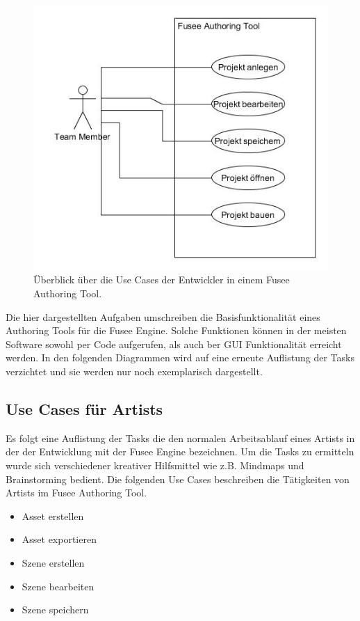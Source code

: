 \documentclass[pagesize, paper=a4, fontsize=12pt, titlepage=true, headings=small, headnosepline, abstractoff, liststotoc, nochapterprefix, plainheadsepline, twoside]{scrreprt}
\begin{document}
\begin{figure}[ht]
	\centering
	\includegraphics[width=\linewidth]{Bilder/UseCase_Allgemein.jpg}
	\caption{Überblick über die Use Cases der Entwickler in einem Fusee Authoring Tool.}
	\label{UseCaseAllgemein}
\end{figure}
Die hier dargestellten Aufgaben umschreiben die Basisfunktionalität eines Authoring Tools für die Fusee Engine. Solche Funktionen können in der meisten Software sowohl per Code aufgerufen, als auch ber GUI Funktionalität erreicht werden. In den folgenden Diagrammen wird auf eine erneute Auflistung der Tasks verzichtet und sie werden nur noch exemplarisch dargestellt.

\subsection{Use Cases für Artists}
Es folgt eine Auflistung der Tasks die den normalen Arbeitsablauf eines Artists in der der Entwicklung mit der Fusee Engine bezeichnen. Um die Tasks zu ermitteln wurde sich verschiedener kreativer Hilfsmittel wie z.B. Mindmaps und Brainstorming bedient. Die folgenden Use Cases beschreiben die Tätigkeiten von Artists im Fusee Authoring Tool.
\begin{itemize}
\item Asset erstellen
\item Asset exportieren
\item Szene erstellen
\item Szene bearbeiten
\item Szene speichern
\end{itemize}
\end{document}

